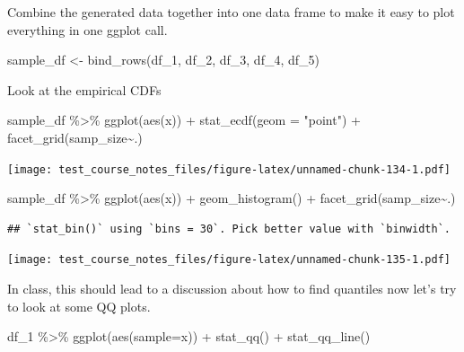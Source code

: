 \documentclass[
]{book}
\newenvironment{Shaded}{\begin{snugshade}}{\end{snugshade}}
\newcommand{\AttributeTok}[1]{\textcolor[rgb]{0.77,0.63,0.00}{#1}}
\newcommand{\FunctionTok}[1]{\textcolor[rgb]{0.00,0.00,0.00}{#1}}
\newcommand{\NormalTok}[1]{#1}
\newcommand{\OtherTok}[1]{\textcolor[rgb]{0.56,0.35,0.01}{#1}}
\newcommand{\SpecialCharTok}[1]{\textcolor[rgb]{0.00,0.00,0.00}{#1}}
\newcommand{\StringTok}[1]{\textcolor[rgb]{0.31,0.60,0.02}{#1}}
\begin{document}
Combine the generated data together into one data frame to make it easy to plot everything in one ggplot call.

\begin{Shaded}
\begin{Highlighting}[]
\NormalTok{sample\_df }\OtherTok{\textless{}{-}} \FunctionTok{bind\_rows}\NormalTok{(df\_1, df\_2, df\_3, df\_4, df\_5)}
\end{Highlighting}
\end{Shaded}

Look at the empirical CDFs

\begin{Shaded}
\begin{Highlighting}[]
\NormalTok{sample\_df }\SpecialCharTok{\%\textgreater{}\%} 
  \FunctionTok{ggplot}\NormalTok{(}\FunctionTok{aes}\NormalTok{(x)) }\SpecialCharTok{+}
  \FunctionTok{stat\_ecdf}\NormalTok{(}\AttributeTok{geom =} \StringTok{"point"}\NormalTok{) }\SpecialCharTok{+}
  \FunctionTok{facet\_grid}\NormalTok{(samp\_size}\SpecialCharTok{\textasciitilde{}}\NormalTok{.)}
\end{Highlighting}
\end{Shaded}

\texttt{[image: test\_course\_notes\_files/figure-latex/unnamed-chunk-134-1.pdf]}

\begin{Shaded}
\begin{Highlighting}[]
\NormalTok{sample\_df }\SpecialCharTok{\%\textgreater{}\%} 
  \FunctionTok{ggplot}\NormalTok{(}\FunctionTok{aes}\NormalTok{(x)) }\SpecialCharTok{+}
  \FunctionTok{geom\_histogram}\NormalTok{() }\SpecialCharTok{+}
  \FunctionTok{facet\_grid}\NormalTok{(samp\_size}\SpecialCharTok{\textasciitilde{}}\NormalTok{.)}
\end{Highlighting}
\end{Shaded}

\begin{verbatim}
## `stat_bin()` using `bins = 30`. Pick better value with `binwidth`.
\end{verbatim}

\texttt{[image: test\_course\_notes\_files/figure-latex/unnamed-chunk-135-1.pdf]}

In class, this should lead to a discussion about how to find quantiles now let's try to look at some QQ plots.

\begin{Shaded}
\begin{Highlighting}[]
\NormalTok{df\_1 }\SpecialCharTok{\%\textgreater{}\%} 
  \FunctionTok{ggplot}\NormalTok{(}\FunctionTok{aes}\NormalTok{(}\AttributeTok{sample=}\NormalTok{x)) }\SpecialCharTok{+}
  \FunctionTok{stat\_qq}\NormalTok{() }\SpecialCharTok{+}
  \FunctionTok{stat\_qq\_line}\NormalTok{()}
\end{Highlighting}
\end{Shaded}
\end{document}
